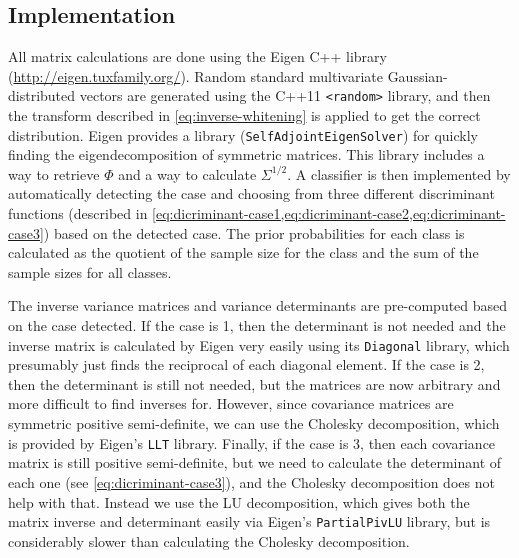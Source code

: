 \documentclass[headings=optiontoheadandtoc,listof=totoc,parskip=full]{scrartcl}
\begin{document}
\subsection{Implementation}

All matrix calculations are done using the Eigen C++ library (\url{http://eigen.tuxfamily.org/}). Random standard multivariate Gaussian-distributed vectors are generated using the C++11 \texttt{<random>} library, and then the transform described in \cref{eq:inverse-whitening} is applied to get the correct distribution. Eigen provides a library (\texttt{SelfAdjointEigenSolver}) for quickly finding the eigendecomposition of symmetric matrices. This library includes a way to retrieve $\Phi$ and a way to calculate $\Sigma^{1/2}$. A classifier is then implemented by automatically detecting the case and choosing from three different discriminant functions (described in \cref{eq:dicriminant-case1,eq:dicriminant-case2,eq:dicriminant-case3}) based on the detected case. The prior probabilities for each class is calculated as the quotient of the sample size for the class and the sum of the sample sizes for all classes.

The inverse variance matrices and variance determinants are pre-computed based on the case detected. If the case is 1, then the determinant is not needed and the inverse matrix is calculated by Eigen very easily using its \texttt{Diagonal} library, which presumably just finds the reciprocal of each diagonal element. If the case is 2, then the determinant is still not needed, but the matrices are now arbitrary and more difficult to find inverses for. However, since covariance matrices are symmetric positive semi-definite, we can use the Cholesky decomposition, which is provided by Eigen's \texttt{LLT} library. Finally, if the case is 3, then each covariance matrix is still positive semi-definite, but we need to calculate the determinant of each one (see \cref{eq:dicriminant-case3}), and the Cholesky decomposition does not help with that. Instead we use the LU decomposition, which gives both the matrix inverse and determinant easily via Eigen's \texttt{PartialPivLU} library, but is considerably slower than calculating the Cholesky decomposition.
\end{document}
